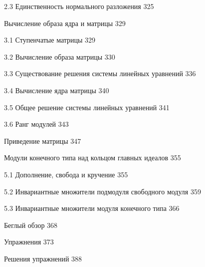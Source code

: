 \documentclass{mai_book}
\begin{document}
{ 2.3 Единственность нормального разложения \dotfill \hspace{0.5cm} 325
 
 \hspace{0.05cm} Вычисление образа ядра и матрицы \dotfill \hspace{0.5cm} 329
 
 3.1 Ступенчатые матрицы \dotfill \hspace{0.5cm} 329
 
 3.2 Вычисление образа матрицы \dotfill \hspace{0.5cm} 330
 
3.3 Существование решения системы линейных уравнений \dotfill \hspace{0.5cm} 336
 
3.4 Вычисление ядра матрицы \dotfill \hspace{0.5cm} 340
 
3.5 Общее решение системы линейных уравнений \dotfill \hspace{0.5cm} 341

3.6 Ранг модулей \dotfill \hspace{0.5cm} 343
 
 \hspace{0.05cm} Приведение матрицы \dotfill \hspace{0.5cm} 347
 
 \hspace{0.05cm} Модули конечного типа над кольцом главных идеалов \dotfill \hspace{0.5cm} 355
 
5.1 Дополнение, свобода и кручение \dotfill \hspace{0.5cm} 355
 
5.2 Инвариантные множители подмодуля свободного модуля \dotfill \hspace{0.5cm} 359
 
5.3 Инвариантные множители модуля конечного типа \dotfill \hspace{0.5cm} 366
 
 \hspace{0.05cm} Беглый обзор \dotfill \hspace{0.5cm} 368
 
\noindent Упражнения \dotfill \hspace{0.5cm} 373 
 
\noindent Решения упражнений \dotfill \hspace{0.5cm} 388
\newline
 
}
\end{document}
